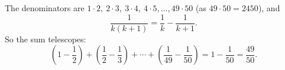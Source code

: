 The denominators are $1\cdot2,\ 2\cdot3,\ 3\cdot4,\ 4\cdot5,\dots,49\cdot50$ (as $49\cdot50=2450$), and
\[
\dfrac{1}{k(k+1)}=\dfrac{1}{k}-\dfrac{1}{k+1}.
\]
So the sum telescopes:
\[
\left(1-\dfrac{1}{2}\right)+\left(\dfrac{1}{2}-\dfrac{1}{3}\right)+\cdots+\left(\dfrac{1}{49}-\dfrac{1}{50}\right)=1-\dfrac{1}{50}=\boxed{\dfrac{49}{50}} .
\]
